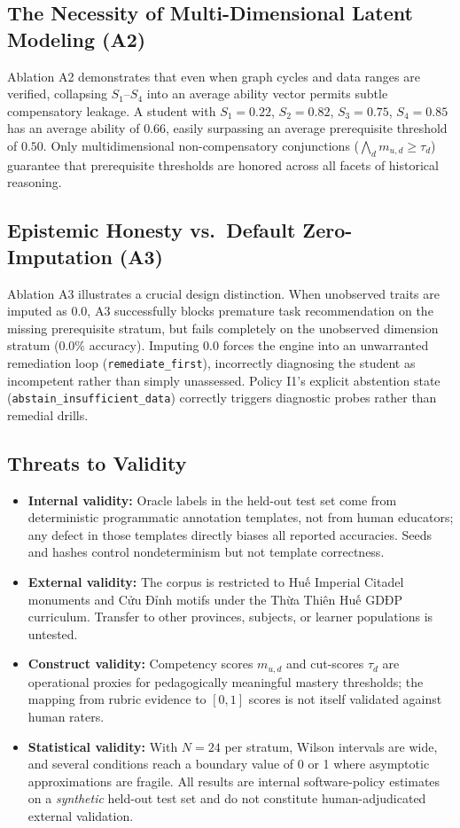 \documentclass[11pt,a4paper]{article}
\begin{document}
\subsection{The Necessity of Multi-Dimensional Latent Modeling (A2)}
Ablation A2 demonstrates that even when graph cycles and data ranges are verified, collapsing $S_1$--$S_4$ into an average ability vector permits subtle compensatory leakage. A student with $S_1 = 0.22$, $S_2 = 0.82$, $S_3 = 0.75$, $S_4 = 0.85$ has an average ability of $0.66$, easily surpassing an average prerequisite threshold of $0.50$. Only multidimensional non-compensatory conjunctions ($\bigwedge_{d} m_{u, d} \ge \tau_d$) guarantee that prerequisite thresholds are honored across all facets of historical reasoning.

\subsection{Epistemic Honesty vs.\ Default Zero-Imputation (A3)}
Ablation A3 illustrates a crucial design distinction. When unobserved traits are imputed as $0.0$, A3 successfully blocks premature task recommendation on the missing prerequisite stratum, but fails completely on the unobserved dimension stratum ($0.0\%$ accuracy). Imputing $0.0$ forces the engine into an unwarranted remediation loop (\texttt{remediate\_first}), incorrectly diagnosing the student as incompetent rather than simply unassessed. Policy I1's explicit abstention state (\texttt{abstain\_insufficient\_data}) correctly triggers diagnostic probes rather than remedial drills.

\subsection{Threats to Validity}

\begin{itemize}[leftmargin=1.5em]
    \item \textbf{Internal validity:} Oracle labels in the held-out test set come from deterministic programmatic annotation templates, not from human educators; any defect in those templates directly biases all reported accuracies. Seeds and hashes control nondeterminism but not template correctness.
    \item \textbf{External validity:} The corpus is restricted to Huế Imperial Citadel monuments and Cửu Đỉnh motifs under the Thừa Thiên Huế GDĐP curriculum. Transfer to other provinces, subjects, or learner populations is untested.
    \item \textbf{Construct validity:} Competency scores $m_{u,d}$ and cut-scores $\tau_d$ are operational proxies for pedagogically meaningful mastery thresholds; the mapping from rubric evidence to $[0,1]$ scores is not itself validated against human raters.
    \item \textbf{Statistical validity:} With $N=24$ per stratum, Wilson intervals are wide, and several conditions reach a boundary value of 0 or 1 where asymptotic approximations are fragile. All results are internal software-policy estimates on a \emph{synthetic} held-out test set and do not constitute human-adjudicated external validation.
\end{itemize}
\end{document}

